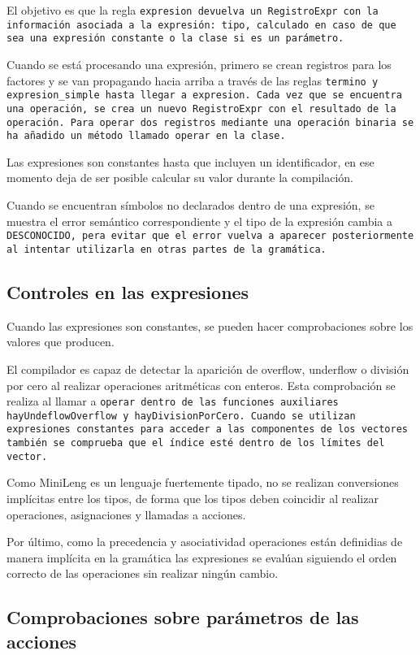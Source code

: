 El objetivo es que la regla \tt{expresion} devuelva un \tt{RegistroExpr} con la información asociada a la expresión: tipo, calculado en caso de que sea una expresión constante o la clase si es un parámetro.

Cuando se está procesando una expresión, primero se crean registros para los factores y se van propagando hacia arriba a través de las reglas \tt{termino} y \tt{expresion\_simple} hasta llegar a \tt{expresion}. Cada vez que se encuentra una operación, se crea un nuevo \tt{RegistroExpr} con el resultado de la operación. Para operar dos registros mediante una operación binaria se ha añadido un método llamado \tt{operar} en la clase.

Las expresiones son constantes hasta que incluyen un identificador, en ese momento deja de ser posible calcular su valor durante la compilación.

Cuando se encuentran símbolos no declarados dentro de una expresión, se muestra el error semántico correspondiente y el tipo de la expresión cambia a \tt{DESCONOCIDO}, pera evitar que el error vuelva a aparecer posteriormente al intentar utilizarla en otras partes de la gramática.


\subsection{Controles en las expresiones}
Cuando las expresiones son constantes, se pueden hacer comprobaciones sobre los valores que producen.

El compilador es capaz de detectar la aparición de overflow, underflow o división por cero al realizar operaciones aritméticas con enteros. Esta comprobación se realiza al llamar a \tt{operar} dentro de las funciones auxiliares \tt{hayUndeflowOverflow} y \tt{hayDivisionPorCero}. Cuando se utilizan expresiones constantes para acceder a las componentes de los vectores también se comprueba que el índice esté dentro de los límites del vector.

Como MiniLeng es un lenguaje fuertemente tipado, no se realizan conversiones implícitas entre los tipos, de forma que los tipos deben coincidir al realizar operaciones, asignaciones y llamadas a acciones.

Por último, como la precedencia y asociatividad operaciones están definidias de manera implícita en la gramática las expresiones se evalúan siguiendo el orden correcto de las operaciones sin realizar ningún cambio.

\subsection{Comprobaciones sobre parámetros de las acciones}

